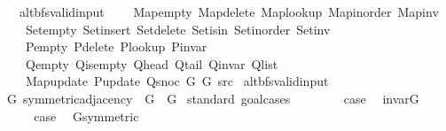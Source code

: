 \begin{isabellebody}
\ \ \ alt{\isacharunderscore}{\kern0pt}bfs{\isacharunderscore}{\kern0pt}valid{\isacharunderscore}{\kern0pt}input\isanewline
\ \ \ \ Map{\isacharunderscore}{\kern0pt}empty\ Map{\isacharunderscore}{\kern0pt}delete\ Map{\isacharunderscore}{\kern0pt}lookup\ Map{\isacharunderscore}{\kern0pt}inorder\ Map{\isacharunderscore}{\kern0pt}inv\isanewline
\ \ \ \ Set{\isacharunderscore}{\kern0pt}empty\ Set{\isacharunderscore}{\kern0pt}insert\ Set{\isacharunderscore}{\kern0pt}delete\ Set{\isacharunderscore}{\kern0pt}isin\ Set{\isacharunderscore}{\kern0pt}inorder\ Set{\isacharunderscore}{\kern0pt}inv\isanewline
\ \ \ \ P{\isacharunderscore}{\kern0pt}empty\ P{\isacharunderscore}{\kern0pt}delete\ P{\isacharunderscore}{\kern0pt}lookup\ P{\isacharunderscore}{\kern0pt}invar\isanewline
\ \ \ \ Q{\isacharunderscore}{\kern0pt}empty\ Q{\isacharunderscore}{\kern0pt}is{\isacharunderscore}{\kern0pt}empty\ Q{\isacharunderscore}{\kern0pt}head\ Q{\isacharunderscore}{\kern0pt}tail\ Q{\isacharunderscore}{\kern0pt}invar\ Q{\isacharunderscore}{\kern0pt}list\isanewline
\ \ \ \ Map{\isacharunderscore}{\kern0pt}update\ P{\isacharunderscore}{\kern0pt}update\ Q{\isacharunderscore}{\kern0pt}snoc\ G{}\ G{}\ src{\isachardoublequoteclose}%
\endisataginvisible
{\isafoldinvisible}%
%
\isadeliminvisible
\isanewline
%
\endisadeliminvisible
\isanewline
{}\isamarkupfalse%
\ alt{\isacharunderscore}{\kern0pt}bfs{\isacharunderscore}{\kern0pt}valid{\isacharunderscore}{\kern0pt}input\isanewline
{}\isanewline
\isanewline
{}\isamarkupfalse%
\ G{}{\isacharcolon}{\kern0pt}\ symmetric{\isacharunderscore}{\kern0pt}adjacency\ \ G\ {\isacharequal}{\kern0pt}\ G{}\isanewline
%
\isadelimproof
%
\endisadelimproof
%
\isatagproof
{}\isamarkupfalse%
\ {\isacharparenleft}{\kern0pt}standard{\isacharcomma}{\kern0pt}\ goal{\isacharunderscore}{\kern0pt}cases{\isacharparenright}{\kern0pt}\isanewline
\ \ \isamarkupfalse%
\ {}\isanewline
\ \ \isamarkupfalse%
\ {\isacharquery}{\kern0pt}case\ \isamarkupfalse%
\ invar{\isacharunderscore}{\kern0pt}G{}\ \isacommand{{\isachardot}{\kern0pt}}\isamarkupfalse%
\isanewline
{}\isamarkupfalse%
\isanewline
\ \ \isamarkupfalse%
\ {}\isanewline
\ \ \isamarkupfalse%
\ {\isacharquery}{\kern0pt}case\ \isamarkupfalse%
\ G{}{\isacharunderscore}{\kern0pt}symmetric\ \isacommand{{\isachardot}{\kern0pt}}\isamarkupfalse%

\end{isabellebody}
